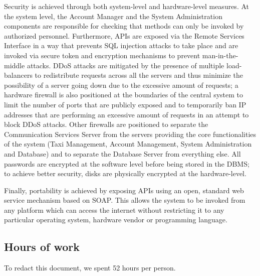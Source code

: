 Security is achieved through both system-level and hardware-level measures. At the system level, the Account Manager and the System Administration components are responsible for checking that methods can only be invoked by authorized personnel. Furthermore, APIs are exposed via the Remote Services Interface in a way that prevents SQL injection attacks to take place and are invoked via secure token and encryption mechanisms to prevent man-in-the-middle attacks. DDoS attacks are mitigated by the presence of multiple load-balancers to redistribute requests across all the servers and thus minimize the possibility of a server going down due to the excessive amount of requests; a hardware firewall is also positioned at the boundaries of the central system to limit the number of ports that are publicly exposed and to temporarily ban IP addresses that are performing an excessive amount of requests in an attempt to block DDoS attacks. Other firewalls are positioned to separate the Communication Services Server from the servers providing the core functionalities of the system (Taxi Management, Account Management, System Administration and Database) and to separate the Database Server from everything else. All passwords are encrypted at the software level before being stored in the DBMS; to achieve better security, disks are physically encrypted at the hardware-level.

Finally, portability is achieved by exposing APIs using an open, standard web service mechanism based on SOAP. This allows the system to be invoked from any platform which can access the internet without restricting it to any particular operating system, hardware vendor or programming language. 

\begin{appendices}

\chapter{Hours of work}
To redact this document, we spent 52 hours per person.

\end{appendices}